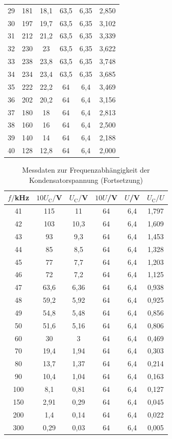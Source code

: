 \begin{table}
\begin{tabular}{c c c c c c}
 29	  & 181	   & 18,1  & 63,5 & 6,35& 2,850 \\
 30	  & 197	   & 19,7  & 63,5 & 6,35& 3,102 \\
 31	  & 212	   & 21,2  & 63,5 & 6,35& 3,339 \\
 32	  & 230	   & 23    & 63,5 & 6,35& 3,622 \\
 33	  & 238	   & 23,8  & 63,5 & 6,35& 3,748 \\
 34	  & 234	   & 23,4  & 63,5 & 6,35& 3,685 \\
 35	  & 222	   & 22,2  & 64   & 6,4 & 3,469 \\
 36	  & 202	   & 20,2  & 64   & 6,4 & 3,156 \\
 37	  & 180	   & 18    & 64   & 6,4 & 2,813 \\
 38	  & 160	   & 16    & 64   & 6,4 & 2,500 \\
 39	  & 140	   & 14    & 64   & 6,4 & 2,188 \\
 40	  & 128	   & 12,8  & 64   & 6,4 & 2,000 \\
\bottomrule
\end{tabular}
\end{table}

\begin{table}
\centering
\caption{Messdaten zur Frequenzabhängigkeit der Kondensatorspannung (Fortsetzung)}
\label{tab:amplitude2}
\begin{tabular}{c c c c c c}
\toprule
$f/$kHz & $10U_\mathrm{C}/$V & $U_\mathrm{C}/$V & $10U$/V & $U$/V & $U_\mathrm{C}/U$ \\
\midrule
 41	  & 115	   & 11    & 64   & 6,4 & 1,797 \\
 42	  & 103	   & 10,3  & 64   & 6,4 & 1,609 \\
 43	  &  93	   &  9,3  & 64   & 6,4 & 1,453 \\
 44	  &  85	   &  8,5  & 64   & 6,4 & 1,328 \\
 45	  &  77	   &  7,7  & 64   & 6,4 & 1,203 \\
 46	  &  72	   &  7,2  & 64   & 6,4 & 1,125 \\
 47	  &  63,6  &  6,36 & 64   & 6,4 & 0,938 \\
 48	  &  59,2  &  5,92 & 64   & 6,4 & 0,925 \\
 49	  &  54,8	 &  5,48 & 64   & 6,4 & 0,856 \\
 50	  &  51,6	 &  5,16 & 64   & 6,4 & 0,806 \\
 60	  &  30	   &  3    & 64   & 6,4 & 0,469 \\
 70	  &  19,4	 &  1,94 & 64   & 6,4 & 0,303 \\
 80	  &  13,7	 &  1,37 & 64   & 6,4 & 0,214 \\
 90	  &  10,4	 &  1,04 & 64   & 6,4 & 0,163 \\
100 	&   8,1	 &  0,81 & 64   & 6,4 & 0,127 \\
150	  &   2,91 &	0,29 & 64   & 6,4 & 0,045 \\
200	  &   1,4	 &  0,14 & 64   & 6,4 & 0,022 \\
300	  &   0,29 &	0,03 & 64   & 6,4 & 0,005 \\
\bottomrule
\end{tabular}
\end{table}

